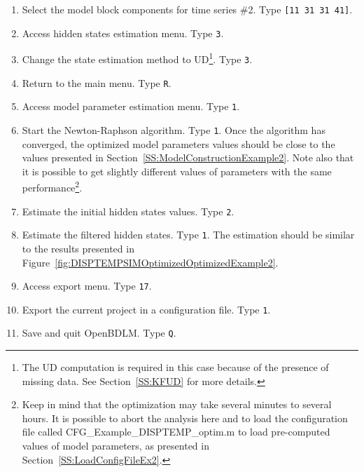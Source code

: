 \begin{enumerate}
\item Select the model block components for time series \#2. Type \colorbox{light-gray}{\lstinline[basicstyle = \mlttfamily \small, backgroundcolor = \color{light-gray}]![11 31 31 41]!}.
\item Access hidden states estimation menu. Type \colorbox{light-gray}{\lstinline[basicstyle = \mlttfamily \small, backgroundcolor = \color{light-gray}]!3!}. 
\item Change the state estimation method to UD\footnote{The UD computation is required in this case because of the presence of missing data. See Section~\ref{SS:KFUD} for more details.}. Type \colorbox{light-gray}{\lstinline[basicstyle = \mlttfamily \small, backgroundcolor = \color{light-gray}]!3!}. 
\item Return to the main menu. Type \colorbox{light-gray}{\lstinline[basicstyle = \mlttfamily \small, backgroundcolor = \color{light-gray}]!R!}.
\item Access model parameter estimation menu. Type \colorbox{light-gray}{\lstinline[basicstyle = \mlttfamily \small, backgroundcolor = \color{light-gray}]!1!}. 
\item Start the Newton-Raphson algorithm. Type \colorbox{light-gray}{\lstinline[basicstyle = \mlttfamily \small, backgroundcolor = \color{light-gray}]!1!}. Once the algorithm has converged, the optimized model parameters values should be close to the values presented in Section~\ref{SS:ModelConstructionExample2}. Note also that it is possible to get slightly different values of parameters with the same performance\footnote{Keep in mind that the optimization may take several minutes to several hours. It is possible to abort the analysis here and to load the configuration file called CFG\_Example\_DISPTEMP\_optim.m to load pre-computed values of model parameters, as presented in Section~\ref{SS:LoadConfigFileEx2}.}.
\item Estimate the initial hidden states values. Type \colorbox{light-gray}{\lstinline[basicstyle = \mlttfamily \small, backgroundcolor = \color{light-gray}]!2!}.
\item Estimate the filtered hidden states. Type \colorbox{light-gray}{\lstinline[basicstyle = \mlttfamily \small, backgroundcolor = \color{light-gray}]!1!}. The estimation should be similar to the results presented in Figure~\ref{fig:DISPTEMPSIMOptimizedOptimizedExample2}.
\item Access export menu. Type \colorbox{light-gray}{\lstinline[basicstyle = \mlttfamily \small, backgroundcolor = \color{light-gray}]!17!}. 
\item Export the current project in a configuration file. Type \colorbox{light-gray}{\lstinline[basicstyle = \mlttfamily \small, backgroundcolor = \color{light-gray}]!1!}.
\item Save and quit OpenBDLM. Type \colorbox{light-gray}{\lstinline[basicstyle = \mlttfamily \small, backgroundcolor = \color{light-gray}]!Q!}.
\end{enumerate}





